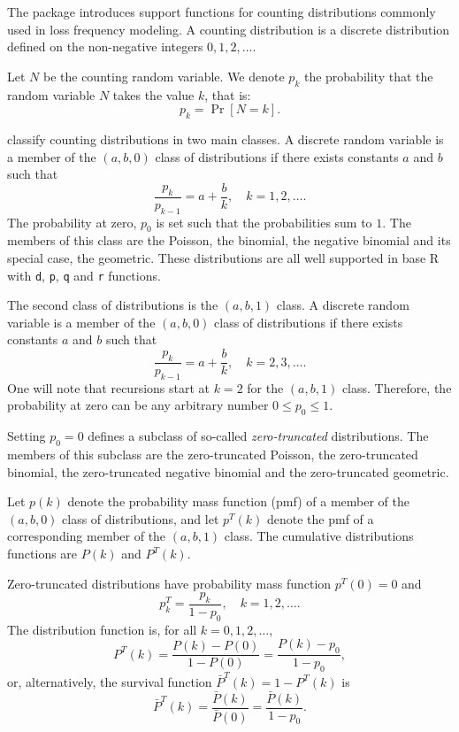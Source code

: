 \documentclass[x11names]{article}
\newcommand{\proglang}[1]{\textsf{#1}}
\newcommand{\code}[1]{\texttt{#1}}
\begin{document}
The package introduces support functions for counting distributions
commonly used in loss frequency modeling. A counting distribution is a
discrete distribution defined on the non-negative integers
$0, 1, 2, \dots$.

Let $N$ be the counting random variable. We denote $p_k$ the
probability that the random variable $N$ takes the value $k$, that is:
\begin{equation*}
  p_k = \Pr[N = k].
\end{equation*}

\citet{LossModels4e} classify counting distributions in two main
classes. A discrete random variable is a member of the $(a, b, 0)$
class of distributions if there exists constants $a$ and $b$ such that
\begin{equation*}
  \frac{p_k}{p_{k - 1}} = a + \frac{b}{k}, \quad k = 1, 2, \dots.
\end{equation*}
The probability at zero, $p_0$ is set such that the probabilities sum
to $1$. The members of this class are the Poisson, the binomial, the
negative binomial and its special case, the geometric. These
distributions are all well supported in base \proglang{R} with
\code{d}, \code{p}, \code{q} and \code{r} functions.

The second class of distributions is the $(a, b, 1)$ class. A discrete
random variable is a member of the $(a, b, 0)$ class of distributions
if there exists constants $a$ and $b$ such that
\begin{equation*}
  \frac{p_k}{p_{k - 1}} = a + \frac{b}{k}, \quad k = 2, 3, \dots.
\end{equation*}
One will note that recursions start at $k = 2$ for the $(a, b, 1)$
class. Therefore, the probability at zero can be any arbitrary number
$0 \leq p_0 \leq 1$.

Setting $p_0 = 0$ defines a subclass of so-called
\emph{zero-truncated} distributions. The members of this subclass are
the zero-truncated Poisson, the zero-truncated binomial, the
zero-truncated negative binomial and the zero-truncated geometric.

Let $p(k)$ denote the probability mass function (pmf) of a member of
the $(a, b, 0)$ class of distributions, and let $p^T(k)$ denote the
pmf of a corresponding member of the $(a, b, 1)$ class. The cumulative
distributions functions are $P(k)$ and $P^T(k)$.

Zero-truncated distributions have probability mass function
$p^T(0) = 0$ and
\begin{equation*}
  p_k^T = \frac{p_k}{1 - p_0}, \quad k = 1, 2, \dots.
\end{equation*}
The distribution function is, for all $k = 0, 1, 2, \dots$,
\begin{equation*}
  P^T(k)
  = \frac{P(k) - P(0)}{1 - P(0)}
  = \frac{P(k) - p_0}{1 - p_0},
\end{equation*}
or, alternatively, the survival function $\bar{P}^T(k) = 1 - P^T(k)$
is
\begin{equation*}
  \bar{P}^T(k)
  = \frac{\bar{P}(k)}{\bar{P}(0)}
  = \frac{\bar{P}(k)}{1 - p_0}.
\end{equation*}
\end{document}
